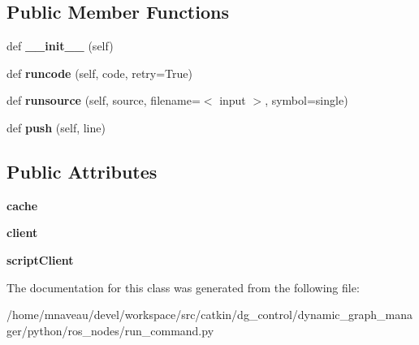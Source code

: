 \subsection*{Public Member Functions}
\begin{DoxyCompactItemize}
\item 
def {\bfseries \+\_\+\+\_\+init\+\_\+\+\_\+} (self)\hypertarget{classros__nodes_1_1run__command_1_1RosShell_af595f986a19e35ca44f248d82ca33580}{}\label{classros__nodes_1_1run__command_1_1RosShell_af595f986a19e35ca44f248d82ca33580}

\item 
def {\bfseries runcode} (self, code, retry=True)\hypertarget{classros__nodes_1_1run__command_1_1RosShell_a8135e6c92d4eb75a923a0643b3a24d5a}{}\label{classros__nodes_1_1run__command_1_1RosShell_a8135e6c92d4eb75a923a0643b3a24d5a}

\item 
def {\bfseries runsource} (self, source, filename=\textquotesingle{}$<$ input $>$\textquotesingle{}, symbol=\textquotesingle{}single\textquotesingle{})\hypertarget{classros__nodes_1_1run__command_1_1RosShell_a50c47243869f78e285cc75ce69e9ca7f}{}\label{classros__nodes_1_1run__command_1_1RosShell_a50c47243869f78e285cc75ce69e9ca7f}

\item 
def {\bfseries push} (self, line)\hypertarget{classros__nodes_1_1run__command_1_1RosShell_aec24a74d62ddd442bcd928ba55052239}{}\label{classros__nodes_1_1run__command_1_1RosShell_aec24a74d62ddd442bcd928ba55052239}

\end{DoxyCompactItemize}
\subsection*{Public Attributes}
\begin{DoxyCompactItemize}
\item 
{\bfseries cache}\hypertarget{classros__nodes_1_1run__command_1_1RosShell_aff5a2a323087128f26d3cb481abc9865}{}\label{classros__nodes_1_1run__command_1_1RosShell_aff5a2a323087128f26d3cb481abc9865}

\item 
{\bfseries client}\hypertarget{classros__nodes_1_1run__command_1_1RosShell_ac3f005cf73895189da5064fa4f5322d5}{}\label{classros__nodes_1_1run__command_1_1RosShell_ac3f005cf73895189da5064fa4f5322d5}

\item 
{\bfseries script\+Client}\hypertarget{classros__nodes_1_1run__command_1_1RosShell_ab00770ca70dd019da83e75eb2cede138}{}\label{classros__nodes_1_1run__command_1_1RosShell_ab00770ca70dd019da83e75eb2cede138}

\end{DoxyCompactItemize}


The documentation for this class was generated from the following file\+:\begin{DoxyCompactItemize}
\item 
/home/mnaveau/devel/workspace/src/catkin/dg\+\_\+control/dynamic\+\_\+graph\+\_\+manager/python/ros\+\_\+nodes/run\+\_\+command.\+py\end{DoxyCompactItemize}
